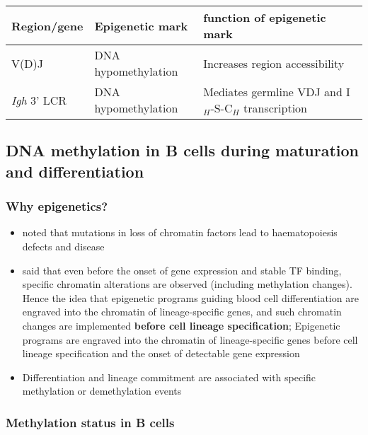 \documentclass[12pt]{article}
\begin{document}
	\begin{table}[h]
		\begin{tabular}{l l l}
			Region/gene         & Epigenetic mark     & function of epigenetic mark                           \\
			\hline
			V(D)J               & DNA hypomethylation & Increases region accessibility                        \\
			\textit{Igh} 3' LCR & DNA hypomethylation & Mediates germline VDJ and I$_H$-S-C$_H$ transcription 
		\end{tabular}
	\end{table}
	
	\subsection{DNA methylation in B cells during maturation and differentiation}
	
	\subsubsection{Why epigenetics?}
	
	\begin{itemize}
		\item \citet{Lara14} noted that mutations in loss of chromatin factors lead to haematopoiesis defects and disease
		\item \citet{Tagoh04} said that even before the onset of gene expression and stable TF binding, specific chromatin alterations are observed (including methylation changes). Hence the idea that epigenetic programs guiding blood cell differentiation are engraved into the chromatin of lineage-specific genes, and such chromatin changes are implemented \textbf{before cell lineage specification}; Epigenetic programs are engraved into the chromatin of lineage-specific genes before cell lineage specification and the onset of detectable gene expression
		\item Differentiation and lineage commitment are associated with specific methylation or demethylation events \citep{Schmidl09}
	\end{itemize}
	
	\subsubsection{Methylation status in B cells}
	
\end{document}
